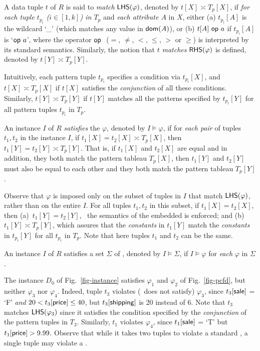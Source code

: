 A data tuple $t$ of $R$ is said to {\em match} ${\mathsf{LHS}}(\varphi)$,
denoted by $t[X] \asymp T_p[X]$, if {\em for each tuple
$t_{p_i}$ ($i\in[1, k]$) in $T_p$} and {\em each attribute $A$} in $X$, either
(a)  $t_{p_i}[A]$ is the wildcard `\_' (which matches any value
in $\protect\mathsf{dom}(A)$),  or
(b) $t[A]\ \op a$ if $t_{p_i}[A]$ is `$\op a$', where
the operator $\op$ ($=$, $\ne$,
$<$, $\le$, $>$ or $\ge$) is interpreted by its standard
semantics. Similarly, the notion that $t$ {\em matches} ${\mathsf{RHS}}(\varphi)$
is defined, denoted by $t[Y] \asymp T_p[Y]$.


Intuitively, each pattern tuple $t_{p_i}$ specifies a condition via
$t_{p_i}[X]$, and $t[X] \asymp T_p[X]$ if
 $t[X]$ satisfies the {\em conjunction} of all these conditions.
Similarly, $t[Y] \asymp T_p[Y]$ if $t[Y]$ matches all the patterns
specified by $t_{p_i}[Y]$ for all pattern tuples $t_{p_i}$ in $T_p$.

An instance $I$ of $R$ {\em satisfies} the \pCFD $\varphi$, denoted
by $I \models \varphi$, if  for {\em each pair} of tuples $t_1, t_2$
in the instance $I$, if $t_1[X] = t_2[X] \asymp T_p[X]$, then
$t_1[Y] = t_2[Y] \asymp T_p[Y]$.  That is, if $t_1[X]$ and $t_2[X]$
are equal and in addition, they both match the pattern tableau
$T_p[X]$, then $t_1[Y]$ and $t_2[Y]$ must also be equal to each
other and they both match the pattern tableau $T_p[Y]$.

Observe that $\varphi$ is imposed only on the subset of tuples in
$I$ that match ${\mathsf{LHS}}(\varphi)$, rather than on the entire $I$. For
all tuples $t_1, t_2$ in this subset, if $t_1[X] = t_2[X]$, then
(a)~$t_1[Y] = t_2[Y]$, \ie~the semantics of the embedded \FDs is
enforced; and (b)~$t_1[Y] \asymp T_p[Y]$, which assures that the
{\em constants} in $t_1[Y]$ match the {\em constants} in $t_{p_i}[Y]$
for all $t_{p_i}$ in $T_p$. Note that here tuples $t_1$ and $t_2$ can
be the same.



An instance $I$ of $R$ satisfies a set $\Sigma$ of \pCFDs,
denoted by $I\models\Sigma$, if $I\models\varphi$ for {\em each}
\pCFD $\varphi$ in $\Sigma$.

\vspace{-1ex}
\begin{example}
The instance $D_0$ of
Fig.~\ref{fig-instance} satisfies $\varphi_1$ and $\varphi_2$ of
Fig.~\ref{fig-pcfd}, but neither $\varphi_3$ nor
$\varphi_4$. Indeed, tuple $t_3$ violates (\ie~does not satisfy)
$\varphi_3$, since
$t_3[\protect\mathsf{sale}]$ = `F' {\em and} $20 < t_3[\protect\mathsf{price}] \le 40$,
but $t_3[\protect\mathsf{shipping}]$ is 20 instead of $6$.
Note that $t_3$ matches ${\mathsf{LHS}}(\varphi_3)$ since it satisfies
the condition specified by the {\em conjunction}
of the pattern tuples in $T_3$.
Similarly, $t_1$ violates $\varphi_4$, since
$t_1[\protect\mathsf{sale}]$ = `T' but $t_1[\protect\mathsf{price}] > 9.99$.
Observe that while it takes two tuples
to violate a standard \FD, a single tuple may violate a
\pCFD.
\end{example}
\vspace{-1.5ex}

